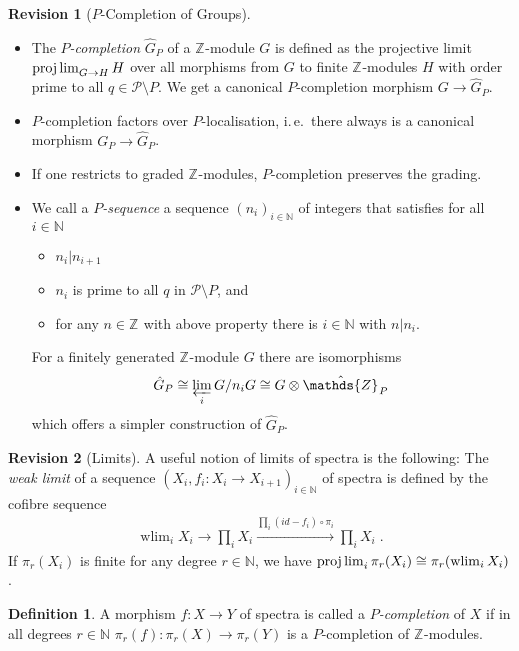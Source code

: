 \documentclass[english]{scrartcl}
\theoremstyle{definition}
\newtheorem*{Def}{Definition}
\newtheorem*{Rev}{Revision}
\theoremstyle{remark}
\newcommand*{\idest}{i.\,e.\ }
\newcommand*{\newdef}[1]{\emph{#1}}
\newcommand*{\N}{\mathds{N}}
\newcommand*{\Z}[1][]{\mathds{Z}_{#1}}  %
\newcommand*{\longto}{\longrightarrow}
\newcommand*{\Ps}{P}  %
\newcommand*{\PS}{\mathcal{P}} %
\newcommand*{\pistar}[2][*]{\pi_{#1}(#2)}  %
\newcommand*{\compl}[2][\Ps]{\hat{#2}_{#1}}  %
\DeclareMathOperator{\wlim}{wlim}  %
\begin{document}
\begin{Rev}[$\Ps$-Completion of Groups]
  \begin{itemize}
  \item The \newdef{$\Ps$-completion} $\compl{G}$ of a $\Z$-module $G$
    is defined as the projective limit $\projlim_{G\to H} H$ over all
    morphisms from $G$ to finite $\Z$-modules $H$ with order prime to
    all $q\in\PS\setminus\Ps$.
    We get a canonical $\Ps$-completion morphism $G\to\compl{G}$.
  \item $\Ps$-completion factors over $\Ps$-localisation, \idest there
    always is a canonical morphism $G_\Ps\to\compl{G}$.
  \item If one restricts to graded $\Z$-modules, $\Ps$-completion
    preserves the grading.
  \item We call a \newdef{$\Ps$-sequence} a sequence $(n_i)_{i\in\N}$ of
    integers that satisfies for all $i\in\N$
    \begin{itemize}
    \item $n_i|n_{i+1}$
    \item $n_i$ is prime to all $q$ in $\PS\setminus\Ps$, and
    \item for any $n\in\Z$ with above property there is $i\in\N$ with $n|n_i$.
    \end{itemize}
    For a finitely generated $\Z$-module $G$ there are isomorphisms
    \begin{gather*}
      \compl{G}
      \cong \varprojlim_i G/n_iG
      \cong G\otimes\compl{\Z}
    \end{gather*}
    which offers a simpler construction of $\compl{G}$.
  \end{itemize}
\end{Rev}
\begin{Rev}[Limits]
  A useful notion of limits of spectra is the following:
  The \newdef{weak limit} of a sequence
  $(X_i, f_i\colon X_i\to X_{i+1})_{i\in\N}$ of spectra is defined
  by the cofibre sequence
  \begin{gather*}
    \wlim_{i} X_i
    \longto \prod_i X_i
    \xrightarrow{\prod_i (id-f_i)\circ \pi_i} \prod_i X_i
    \;.
  \end{gather*}
  If $\pistar[r]{X_i}$ is finite for any degree $r\in\N$, we have
  $\projlim_i \pistar[r]{X_i} \cong \pistar[r]{\wlim_i X_i}$.
\end{Rev}
\begin{Def}
  A morphism $f\colon X\to Y$ of spectra is called a
  \newdef{$\Ps$-completion} of $X$ if in all degrees $r\in\N$
  $\pistar[r]f\colon\pistar[r] X\to\pistar[r] Y$ is a
  $\Ps$-completion of $\Z$-modules.
\end{Def}
\end{document}
